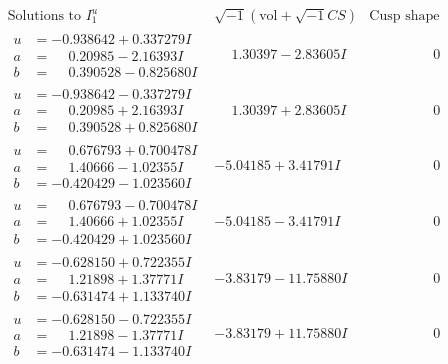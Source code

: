 \documentclass[1p]{elsarticle_modified}
\theoremstyle{definition}
\newcommand{\I}{\sqrt{-1}}
\begin{document}
$$\begin{array}{c|c|c}  
\text{Solutions to }I^u_{1}& \I (\text{vol} + \sqrt{-1}CS) & \text{Cusp shape}\\
 \hline 
\begin{aligned}
u &= -0.938642 + 0.337279 I \\
a &= \phantom{-}0.20985 - 2.16393 I \\
b &= \phantom{-}0.390528 - 0.825680 I\end{aligned}
 & \phantom{-}1.30397 - 2.83605 I & \phantom{-0.000000 } 0 \\ \hline\begin{aligned}
u &= -0.938642 - 0.337279 I \\
a &= \phantom{-}0.20985 + 2.16393 I \\
b &= \phantom{-}0.390528 + 0.825680 I\end{aligned}
 & \phantom{-}1.30397 + 2.83605 I & \phantom{-0.000000 } 0 \\ \hline\begin{aligned}
u &= \phantom{-}0.676793 + 0.700478 I \\
a &= \phantom{-}1.40666 - 1.02355 I \\
b &= -0.420429 - 1.023560 I\end{aligned}
 & -5.04185 + 3.41791 I & \phantom{-0.000000 } 0 \\ \hline\begin{aligned}
u &= \phantom{-}0.676793 - 0.700478 I \\
a &= \phantom{-}1.40666 + 1.02355 I \\
b &= -0.420429 + 1.023560 I\end{aligned}
 & -5.04185 - 3.41791 I & \phantom{-0.000000 } 0 \\ \hline\begin{aligned}
u &= -0.628150 + 0.722355 I \\
a &= \phantom{-}1.21898 + 1.37771 I \\
b &= -0.631474 + 1.133740 I\end{aligned}
 & -3.83179 - 11.75880 I & \phantom{-0.000000 } 0 \\ \hline\begin{aligned}
u &= -0.628150 - 0.722355 I \\
a &= \phantom{-}1.21898 - 1.37771 I \\
b &= -0.631474 - 1.133740 I\end{aligned}
 & -3.83179 + 11.75880 I & \phantom{-0.000000 } 0 \\ \hline\begin{aligned}

\end{aligned}
\end{array}$$
\end{document}
